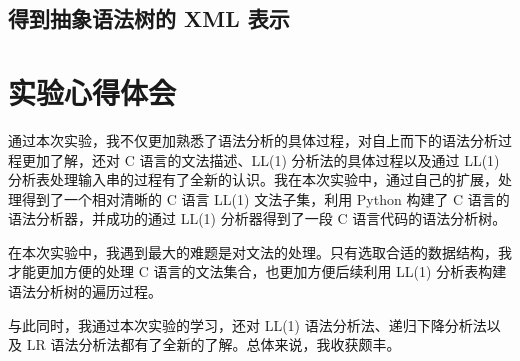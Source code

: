 \documentclass[UTF8]{ctexart}
\begin{document}
\subsection{得到抽象语法树的 XML 表示}

\section{实验心得体会}
通过本次实验，我不仅更加熟悉了语法分析的具体过程，对自上而下的语法分析过程更加了解，还对 C 语言的文法描述、LL(1) 分析法的具体过程以及通过 LL(1) 分析表处理输入串的过程有了全新的认识。我在本次实验中，通过自己的扩展，处理得到了一个相对清晰的 C 语言 LL(1) 文法子集，利用 Python 构建了 C 语言的语法分析器，并成功的通过 LL(1) 分析器得到了一段 C 语言代码的语法分析树。

在本次实验中，我遇到最大的难题是对文法的处理。只有选取合适的数据结构，我才能更加方便的处理 C 语言的文法集合，也更加方便后续利用 LL(1) 分析表构建语法分析树的遍历过程。

与此同时，我通过本次实验的学习，还对 LL(1) 语法分析法、递归下降分析法以及 LR 语法分析法都有了全新的了解。总体来说，我收获颇丰。
\end{document}
